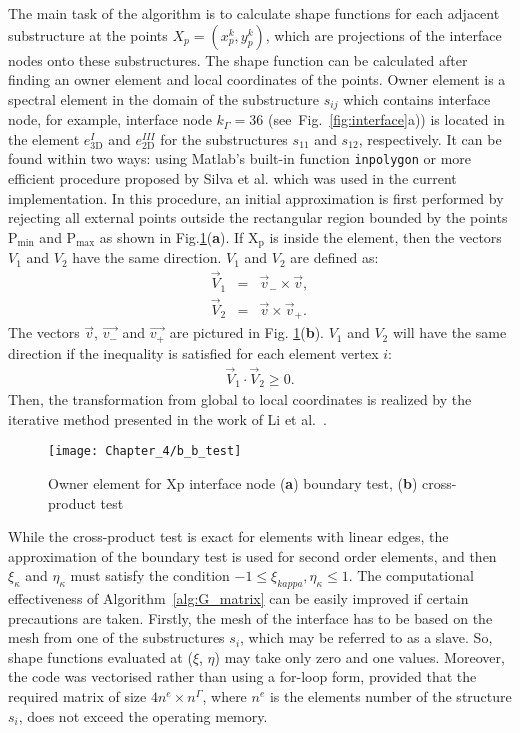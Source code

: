 The main task of the algorithm is to calculate shape functions for each adjacent substructure at the points \(X_p=(x_p^k,y_p^k)\), which are projections of the interface nodes onto these substructures.
The shape function can be calculated after finding an owner element and local coordinates of the points.
Owner element is a spectral element in the domain of the substructure \(s_{ij}\) which contains interface node, for example, interface node \(k_\Gamma=36\) (see~Fig.~\ref{fig:interface}a)) is located in the element \(e^{I}_{3\mathrm{D}}\) and \(e^{III}_{2\mathrm{D}}\) for the substructures \(s_{11}\) and \(s_{12}\), respectively.
It can be found within two ways: using Matlab's built-in function \verb+inpolygon+ or more efficient procedure proposed by Silva et al. \cite{silva2009exact} which was used in the current implementation.
In this procedure, an initial approximation is first performed by rejecting all external points outside the rectangular region bounded by the points \(\mathrm{P_{min}}\) and \(\mathrm{P_{max}}\) as shown in Fig.\ref{fig:b_b_test}(\textbf{a}).
If \(\mathrm{X_p}\) is inside the element, then the vectors \(V_1\) and \(V_2\) have the same direction.
\(V_1\) and \(V_2\) are defined as:
\begin{eqnarray}
	\vec{V}_1 & = & \vec{v}_-\times \vec{v},\\
	\vec{V}_2 & = & \vec{v}\times \vec{v}_+.
\label{eq:v_vectors}
\end{eqnarray}
The vectors \(\vec{v}\), \(\vec{v_-}\) and \(\vec{v_+}\) are pictured in Fig. \ref{fig:b_b_test}(\textbf{b}). \(V_1\) and \(V_2\) will have the same direction if the inequality is satisfied for each element vertex \(i\):
\begin{eqnarray}
		\vec{V}_1 \cdot \vec{V}_2 \geq0.
	\label{eq:dot_prod}
\end{eqnarray}
Then, the transformation from global to local coordinates is realized by the iterative method presented in the work of Li et al.~\cite{li2014efficient}.
\begin{figure}[H]
	\begin{center}
		\texttt{[image: Chapter\_4/b\_b\_test]}
	\end{center}
	\caption{Owner element for Xp interface node (\textbf{a}) boundary test, (\textbf{b}) cross-product test}
	\label{fig:b_b_test}
\end{figure}
While the cross-product test is exact for elements with linear edges, the approximation of the boundary test is used for second order elements, and then \(\xi_{\kappa}\) and \(\eta_{\kappa}\) must satisfy the condition \(-1\leq \xi_{kappa},\eta_{\kappa} \leq 1\).
The computational effectiveness of Algorithm~\ref{alg:G_matrix} can be easily improved if certain precautions are taken.
Firstly, the mesh of the interface has to be based on the mesh from one of the substructures \(s_{i}\), which may be referred to as a slave.
So, shape functions evaluated at (\(\xi\), \(\eta\)) may take only zero and one values.
Moreover, the code was vectorised rather than using a for-loop form, provided that the required matrix of size \(4n^e\times n^{\Gamma}\), where \(n^e\) is the elements number of the structure \(s_i\), does not exceed the operating memory.